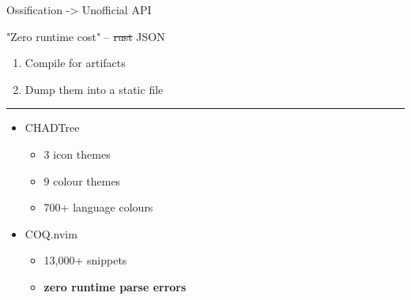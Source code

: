 \documentclass{beamer}
\begin{document}
\begin{frame}{Ossification -> Unofficial API}

	"Zero runtime cost" -- \st{rust} JSON

	\begin{enumerate}

		\item Compile  for artifacts

		\item Dump them into a static file

	\end{enumerate}

	\rule{\textwidth}{0.1em}

	\begin{itemize}

		\item CHADTree

		      \begin{itemize}

			      \item 3 icon themes

			      \item 9 colour themes

			      \item 700+ language colours

		      \end{itemize}

		\item COQ.nvim

		      \begin{itemize}

			      \item 13,000+ snippets

			      \item \textbf{zero runtime parse errors}

		      \end{itemize}

	\end{itemize}

\end{frame}
\end{document}
